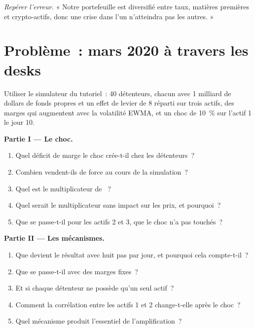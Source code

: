 \begin{exercise}[$\star\star\star$]\label{exo:m3:when-markets-break-together:8}
\emph{Repérer l'erreur.} « Notre portefeuille est diversifié entre taux, matières premières et crypto-actifs, donc une crise dans l'un n'atteindra pas les autres. »
\end{exercise}

\section{Problème~: mars 2020 à travers les desks}

\begin{problem}\label{pb:m3:when-markets-break-together:1}
Utiliser le simulateur du tutoriel~: 40 détenteurs, chacun avec 1 milliard de dollars de fonds propres et un effet de levier de 8 réparti sur trois actifs, des marges qui augmentent avec la volatilité EWMA, et
un choc de 10~\% sur l'actif 1 le jour 10.

\medskip\noindent\textbf{Partie I --- Le choc.}
\begin{enumerate}
\item Quel déficit de marge le choc crée-t-il chez les détenteurs~?
\item Combien vendent-ils de force au cours de la simulation~?
\item Quel est le multiplicateur de ~?
\item Quel serait le multiplicateur sans impact sur les prix, et pourquoi~?
\item Que se passe-t-il pour les actifs 2 et 3, que le choc n'a pas touchés~?
\end{enumerate}

\medskip\noindent\textbf{Partie II --- Les mécanismes.}
\begin{enumerate}[resume]
\item Que devient le résultat avec huit pas par jour, et pourquoi cela compte-t-il~?
\item Que se passe-t-il avec des marges fixes~?
\item Et si chaque détenteur ne possède qu'un seul actif~?
\item Comment la corrélation entre les actifs 1 et 2 change-t-elle après le choc~?
\item Quel mécanisme produit l'essentiel de l'amplification~?
\end{enumerate}


\end{problem}
